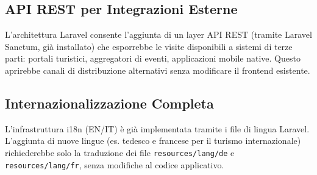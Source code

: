 \subsection{API REST per Integrazioni Esterne}

L'architettura Laravel consente l'aggiunta di un layer API REST (tramite Laravel Sanctum, già installato) che esporrebbe le visite disponibili a sistemi di terze parti: portali turistici, aggregatori di eventi, applicazioni mobile native. Questo aprirebbe canali di distribuzione alternativi senza modificare il frontend esistente.

\subsection{Internazionalizzazione Completa}

L'infrastruttura i18n (EN/IT) è già implementata tramite i file di lingua Laravel. L'aggiunta di nuove lingue (es. tedesco e francese per il turismo internazionale) richiederebbe solo la traduzione dei file \texttt{resources/lang/de} e \texttt{resources/lang/fr}, senza modifiche al codice applicativo.
